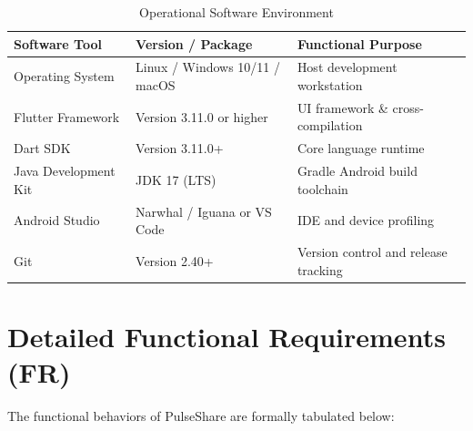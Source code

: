 \documentclass[12pt,a4paper]{report}
\begin{document}
\begin{table}[H]
\centering
\caption{Operational Software Environment}
\label{tab:sw_req}
\begin{tabularx}{\textwidth}{llX}
\toprule
\textbf{Software Tool} & \textbf{Version / Package} & \textbf{Functional Purpose} \\
\midrule
Operating System & Linux / Windows 10/11 / macOS & Host development workstation \\
Flutter Framework & Version 3.11.0 or higher & UI framework \& cross-compilation \\
Dart SDK & Version 3.11.0+ & Core language runtime \\
Java Development Kit & JDK 17 (LTS) & Gradle Android build toolchain \\
Android Studio & Narwhal / Iguana or VS Code & IDE and device profiling \\
Git & Version 2.40+ & Version control and release tracking \\
\bottomrule
\end{tabularx}
\end{table}

\section{Detailed Functional Requirements (FR)}
The functional behaviors of PulseShare are formally tabulated below:
\end{document}
